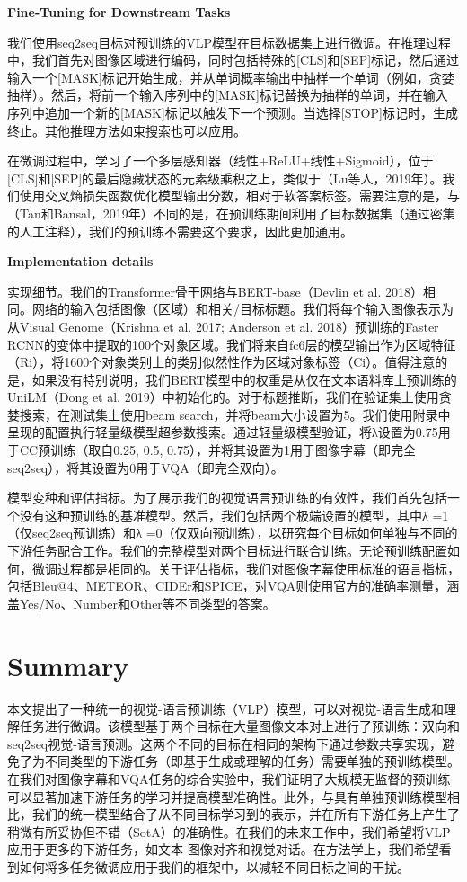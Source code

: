 \documentclass[a4paper]{article}
\begin{document}
\begin{sloppypar}
      \centerline{\textbf{Fine-Tuning for Downstream Tasks}}

      我们使用seq2seq目标对预训练的VLP模型在目标数据集上进行微调。在推理过程中，我们首先对图像区域进行编码，同时包括特殊的[CLS]和[SEP]标记，然后通过输入一个[MASK]标记开始生成，并从单词概率输出中抽样一个单词（例如，贪婪抽样）。然后，将前一个输入序列中的[MASK]标记替换为抽样的单词，并在输入序列中追加一个新的[MASK]标记以触发下一个预测。当选择[STOP]标记时，生成终止。其他推理方法如束搜索也可以应用。

      在微调过程中，学习了一个多层感知器（线性+ReLU+线性+Sigmoid），位于[CLS]和[SEP]的最后隐藏状态的元素级乘积之上，类似于（Lu等人，2019年）。我们使用交叉熵损失函数优化模型输出分数，相对于软答案标签。需要注意的是，与（Tan和Bansal，2019年）不同的是，在预训练期间利用了目标数据集（通过密集的人工注释），我们的预训练不需要这个要求，因此更加通用。

      \centerline{\textbf{Implementation details}}

      实现细节。我们的Transformer骨干网络与BERT-base（Devlin et al. 2018）相同。网络的输入包括图像（区域）和相关/目标标题。我们将每个输入图像表示为从Visual Genome（Krishna et al. 2017; Anderson et al. 2018）预训练的Faster RCNN的变体中提取的100个对象区域。我们将来自fc6层的模型输出作为区域特征（Ri），将1600个对象类别上的类别似然性作为区域对象标签（Ci）。值得注意的是，如果没有特别说明，我们BERT模型中的权重是从仅在文本语料库上预训练的UniLM（Dong et al. 2019）中初始化的。对于标题推断，我们在验证集上使用贪婪搜索，在测试集上使用beam search，并将beam大小设置为5。我们使用附录中呈现的配置执行轻量级模型超参数搜索。通过轻量级模型验证，将λ设置为0.75用于CC预训练（取自{0.25, 0.5, 0.75}），并将其设置为1用于图像字幕（即完全seq2seq），将其设置为0用于VQA（即完全双向）。

      模型变种和评估指标。为了展示我们的视觉语言预训练的有效性，我们首先包括一个没有这种预训练的基准模型。然后，我们包括两个极端设置的模型，其中λ =1（仅seq2seq预训练）和λ =0（仅双向预训练），以研究每个目标如何单独与不同的下游任务配合工作。我们的完整模型对两个目标进行联合训练。无论预训练配置如何，微调过程都是相同的。关于评估指标，我们对图像字幕使用标准的语言指标，包括Bleu@4、METEOR、CIDEr和SPICE，对VQA则使用官方的准确率测量，涵盖Yes/No、Number和Other等不同类型的答案。

      \section{Summary}

      本文提出了一种统一的视觉-语言预训练（VLP）模型，可以对视觉-语言生成和理解任务进行微调。该模型基于两个目标在大量图像文本对上进行了预训练：双向和seq2seq视觉-语言预测。这两个不同的目标在相同的架构下通过参数共享实现，避免了为不同类型的下游任务（即基于生成或理解的任务）需要单独的预训练模型。在我们对图像字幕和VQA任务的综合实验中，我们证明了大规模无监督的预训练可以显著加速下游任务的学习并提高模型准确性。此外，与具有单独预训练模型相比，我们的统一模型结合了从不同目标学习到的表示，并在所有下游任务上产生了稍微有所妥协但不错（SotA）的准确性。在我们的未来工作中，我们希望将VLP应用于更多的下游任务，如文本-图像对齐和视觉对话。在方法学上，我们希望看到如何将多任务微调应用于我们的框架中，以减轻不同目标之间的干扰。


\end{sloppypar}
\end{document}
